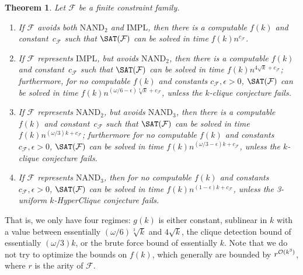 \documentclass[10pt,a4paper]{article}
\theoremstyle{plain}
\newtheorem{thm}{Theorem}[section]
\newcommand{\Oh}{{\cal O}}
\newcommand{\NAND}{\mathrm{NAND}}
\newcommand{\Impl}{\mathrm{IMPL}}
\newcommand{\confam}{\mathcal{F}}
\newcommand{\eps}{\epsilon}
\begin{document}
\begin{thm}
Let $\confam$ be a finite constraint family.
\begin{enumerate}
\item {} If $\confam$ avoids both $\NAND_2$ and $\Impl$, then there is a computable $f(k)$ and constant~$c_\confam$ such that $\SAT(\confam)$ can be solved in time $f(k)n^{c_\confam}$.
\item {}\newline If $\confam$ represents $\Impl$, but avoids $\NAND_2$, then there is a computable $f(k)$ and constant~$c_\confam$ such that $\SAT(\confam)$ can be solved in time $f(k)n^{4\sqrt{k}+c_\confam}$; \newline furthermore, for no computable $f(k)$ and constants $c_\confam, \eps > 0$, $\SAT(\confam)$ can be solved in time  $f(k)n^{(\omega/6-\eps)\sqrt[3]{k}+c_\confam}$, unless the $k$-clique conjecture fails.
\item {}\newline  If $\confam$ represents $\NAND_2$, but avoids $\NAND_3$, then there is a computable $f(k)$ and constant~$c_\confam$ such that $\SAT(\confam)$ can be solved in time $f(k) n^{(\omega/3)k+c_\confam}$; \newline furthermore for no computable $f(k)$ and constants $c_\confam, \eps > 0$, $\SAT(\confam)$ can be solved in time $f(k) n^{(\omega/3-\eps)k+c_\confam}$, unless the $k$-clique conjecture fails. 
\item {}\newline  If $\confam$ represents $\NAND_3$, then for no computable $f(k)$ and constants $c_\confam, \eps > 0$, $\SAT(\confam)$ can be solved in time $f(k)n^{(1-\eps)k+c_\confam}$, unless the 3-uniform $k$-HyperClique conjecture fails. 
\end{enumerate}
\end{thm}
%
%
That is, we only have four regimes: $g(k)$ is either constant, sublinear in $k$ with a value between essentially $(\omega/6) \sqrt[3]{k}$ and $4\sqrt{k}$, the clique detection bound of essentially $(\omega/3) k$, or the brute force bound of essentially $k$.  Note that we do not try to optimize the bounds on $f(k)$, which generally are bounded by $r^{\Oh(k^3)}$, where $r$ is the arity of $\confam$.
%
\end{document}
